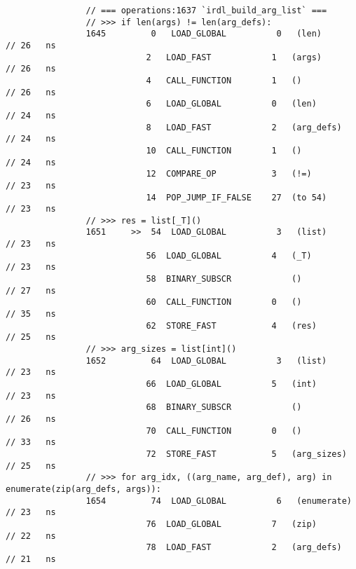\begin{code}
\begin{verbatim}
                // === operations:1637 `irdl_build_arg_list` ===
                // >>> if len(args) != len(arg_defs):
                1645         0   LOAD_GLOBAL          0   (len)                                     // 26   ns
                            2   LOAD_FAST            1   (args)                                     // 26   ns
                            4   CALL_FUNCTION        1   ()                                         // 26   ns
                            6   LOAD_GLOBAL          0   (len)                                      // 24   ns
                            8   LOAD_FAST            2   (arg_defs)                                 // 24   ns
                            10  CALL_FUNCTION        1   ()                                         // 24   ns
                            12  COMPARE_OP           3   (!=)                                       // 23   ns
                            14  POP_JUMP_IF_FALSE    27  (to 54)                                    // 23   ns
                // >>> res = list[_T]()
                1651     >>  54  LOAD_GLOBAL          3   (list)                                    // 23   ns
                            56  LOAD_GLOBAL          4   (_T)                                       // 23   ns
                            58  BINARY_SUBSCR            ()                                         // 27   ns
                            60  CALL_FUNCTION        0   ()                                         // 35   ns
                            62  STORE_FAST           4   (res)                                      // 25   ns
                // >>> arg_sizes = list[int]()
                1652         64  LOAD_GLOBAL          3   (list)                                    // 23   ns
                            66  LOAD_GLOBAL          5   (int)                                      // 23   ns
                            68  BINARY_SUBSCR            ()                                         // 26   ns
                            70  CALL_FUNCTION        0   ()                                         // 33   ns
                            72  STORE_FAST           5   (arg_sizes)                                // 25   ns
                // >>> for arg_idx, ((arg_name, arg_def), arg) in enumerate(zip(arg_defs, args)):
                1654         74  LOAD_GLOBAL          6   (enumerate)                               // 23   ns
                            76  LOAD_GLOBAL          7   (zip)                                      // 22   ns
                            78  LOAD_FAST            2   (arg_defs)                                 // 21   ns

\end{verbatim}
\end{code}
